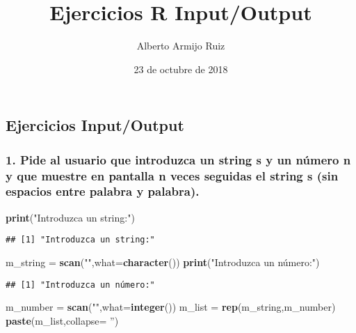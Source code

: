 \documentclass[]{article}
\title{Ejercicios R Input/Output}
\author{Alberto Armijo Ruiz}
\date{23 de octubre de 2018}
\newenvironment{Shaded}{\begin{snugshade}}{\end{snugshade}}
\newcommand{\KeywordTok}[1]{\textcolor[rgb]{0.13,0.29,0.53}{\textbf{#1}}}
\newcommand{\DataTypeTok}[1]{\textcolor[rgb]{0.13,0.29,0.53}{#1}}
\newcommand{\StringTok}[1]{\textcolor[rgb]{0.31,0.60,0.02}{#1}}
\newcommand{\NormalTok}[1]{#1}
\begin{document}
\maketitle

\subsection{Ejercicios Input/Output}\label{ejercicios-inputoutput}

\subsubsection{1. Pide al usuario que introduzca un string s y un número
n y que muestre en pantalla n veces seguidas el string s (sin espacios
entre palabra y
palabra).}\label{pide-al-usuario-que-introduzca-un-string-s-y-un-numero-n-y-que-muestre-en-pantalla-n-veces-seguidas-el-string-s-sin-espacios-entre-palabra-y-palabra.}

\begin{Shaded}
\begin{Highlighting}[]
\KeywordTok{print}\NormalTok{(}\StringTok{"Introduzca un string:"}\NormalTok{)}
\end{Highlighting}
\end{Shaded}

\begin{verbatim}
## [1] "Introduzca un string:"
\end{verbatim}

\begin{Shaded}
\begin{Highlighting}[]
\NormalTok{m_string =}\StringTok{ }\KeywordTok{scan}\NormalTok{(}\StringTok{""}\NormalTok{,}\DataTypeTok{what=}\KeywordTok{character}\NormalTok{())}
\KeywordTok{print}\NormalTok{(}\StringTok{"Introduzca un número:"}\NormalTok{)}
\end{Highlighting}
\end{Shaded}

\begin{verbatim}
## [1] "Introduzca un número:"
\end{verbatim}

\begin{Shaded}
\begin{Highlighting}[]
\NormalTok{m_number =}\StringTok{ }\KeywordTok{scan}\NormalTok{(}\StringTok{""}\NormalTok{,}\DataTypeTok{what=}\KeywordTok{integer}\NormalTok{())}
\NormalTok{m_list =}\StringTok{ }\KeywordTok{rep}\NormalTok{(m_string,m_number)}
\KeywordTok{paste}\NormalTok{(m_list,}\DataTypeTok{collapse=} \StringTok{''}\NormalTok{)}
\end{Highlighting}
\end{Shaded}
\end{document}

